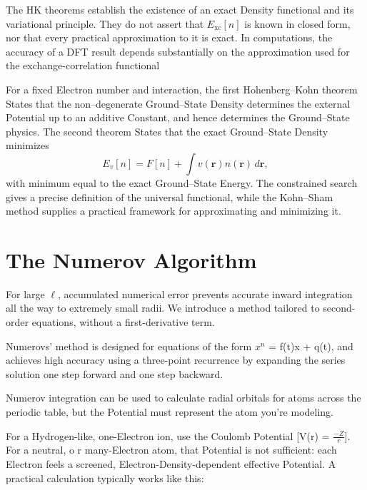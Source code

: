 \documentclass[a4paper, 10pt, onepage]{elegantbook}
\begin{document}
{The HK theorems establish the existence of an exact Density
functional and its variational principle. They do not assert that
\(E_{\mathrm{xc}}[n]\) is known in closed form, nor that every
practical approximation to it is exact. In computations, the
accuracy of a DFT result depends substantially on the approximation
used for the exchange-correlation functional

For a fixed Electron number and interaction, the first
Hohenberg--Kohn theorem States that the non--degenerate Ground--State
Density determines the external Potential up to an additive
Constant, and hence determines the Ground--State physics. The second
theorem States that the exact Ground--State Density minimizes
\begin{equation}
E_v[n]=F[n]+\int v(\mathbf r)n(\mathbf r)\,d\mathbf r,
\end{equation}
with minimum equal to the exact Ground--State Energy. The constrained
search gives a precise definition of the universal functional, while
the Kohn--Sham method supplies a practical framework for approximating
and minimizing it.

\newpage

\section{The Numerov Algorithm}

\noindent

For large $\ell$, accumulated numerical error prevents accurate inward integration all the way to extremely small radii.
 We introduce a method tailored to second-order equations, without a first-derivative term.  

Numerovs' method is designed for equations of the form  $x^n$ = f(t)x + q(t), 
and achieves high accuracy using a three-point recurrence by expanding the series solution one step forward and one 
step backward. 

Numerov integration can be used to calculate radial orbitals for atoms across the periodic table, 
but the Potential must represent the atom you’re modeling.

For a Hydrogen-like, one-Electron ion, use the Coulomb Potential [V(r) = $\frac{-Z}{r}$]. For a neutral, o
r many-Electron atom, that Potential is not sufficient: each Electron feels a screened, Electron-Density-dependent 
effective Potential. 
A practical calculation typically works like this:

}
\end{document}

